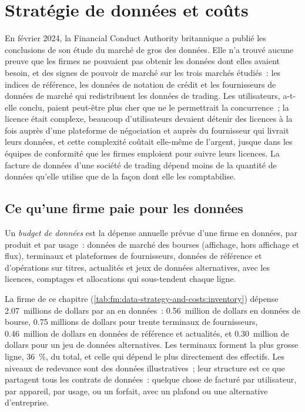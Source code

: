 \chapter{Stratégie de données et coûts}\label{ch:fm:data-strategy-and-costs}

En février 2024, la Financial Conduct Authority britannique a publié les conclusions de son étude du marché de gros des données. Elle n'a trouvé aucune preuve que les
firmes ne pouvaient pas obtenir les données dont elles avaient besoin, et des signes de pouvoir de marché sur les trois marchés étudiés~: les indices de référence, les données de notation de crédit et les
fournisseurs de données de marché qui redistribuent les données de trading. Les utilisateurs, a-t-elle conclu, paient peut-être plus cher que ne le permettrait la concurrence~; la licence était
complexe, beaucoup d'utilisateurs devaient détenir des licences à la fois auprès d'une plateforme de négociation et auprès du fournisseur qui livrait leurs données, et cette complexité coûtait
elle-même de l'argent, jusque dans les équipes de conformité que les firmes emploient pour suivre leurs licences. La facture de données d'une société de trading dépend moins de la
quantité de données qu'elle utilise que de la façon dont elle les comptabilise.

\section{Ce qu'une firme paie pour les données}

\begin{definition}\label{def:fm:data-strategy-and-costs:budget}
Un \emph{budget de données} est la dépense annuelle prévue d'une firme en données, par produit et par usage~: données de marché des bourses (affichage,
hors affichage et flux), terminaux et plateformes de fournisseurs, données de référence et d'opérations sur titres, actualités et jeux de données alternatives, avec les licences,
comptages et allocations qui sous-tendent chaque ligne.
\end{definition}

La firme de ce chapitre (\cref{tab:fm:data-strategy-and-costs:inventory}) dépense 2.07~millions de dollars par an en données~: 0.56~million de dollars en données de bourse, 0.75
millions de dollars pour trente terminaux de fournisseurs, 0.46~million de dollars en données de référence et actualités, et 0.30~million de dollars pour un jeu de données alternatives. Les terminaux
forment la plus grosse ligne, 36~\%, du total, et celle qui dépend le plus directement des effectifs. Les niveaux de redevance sont des données illustratives~; leur structure est ce que partagent
tous les contrats de données~: quelque chose de facturé par utilisateur, par appareil, par usage, ou un forfait, avec un plafond ou une alternative d'entreprise.

